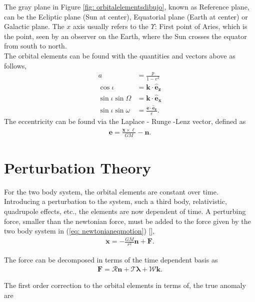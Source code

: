 The gray plane in Figure \ref{fig: orbitalelementsdibujo}, known as Reference plane, can be the Ecliptic plane (Sun at center), Equatorial plane (Earth at center) or Galactic plane. The $x$ axis usually refers to the $\Upsilon$: First point of Aries, which is the point, seen by an observer on the Earth, where the Sun crosses the equator from south to north. \cite{Clarke}\\

The orbital elements can be found with the quantities and vectors above as follows,
\begin{align}
a &= \frac{p}{1-e^2} \\
\cos \iota &= \mathbf{k} \cdot \mathbf{\hat{e}_z}\\
\sin \iota \sin \Omega &=  \mathbf{k} \cdot \mathbf{\hat{e}_x}\\
\sin \iota \sin \omega &=  \frac{\mathbf{e} \cdot \mathbf{\hat{e}_z}}{e}.
\end{align}
The eccentricity can be found via the Laplace - Runge -Lenz vector, defined as
\begin{align}
\mathbf{e} = \frac{\dot{\mathbf{x}}  \times \boldsymbol{\ell}}{GM} - \mathbf{n}.
\end{align}

\section{Perturbation Theory}

 For the two body system, the orbital elements are constant over time. Introducing a perturbation to the system, such a third body, relativistic, quadrupole effects, etc., the elements are now dependent of time. A perturbing force, smaller than the newtonian force, must be added to the force given by the two body system in (\ref{eq: newtonianeqmotion}) [\cite{Brumberg, Sergeiclassical}],
\begin{align}
	\ddot{\mathbf{x}} = -\frac{GM}{r^2} \mathbf{n} + \mathbf{F}.
\end{align}
 
The force can be decomposed in terms of the time dependent basis as
\begin{align}
	\mathbf{F} = \mathcal{R} \mathbf{n} + \mathcal{T} \boldsymbol{\lambda}+ \mathcal{W}\mathbf{k}.
\end{align}

The first order correction to the orbital elements in terms of, the true anomaly are \cite{Brumberg, Larranaga}

